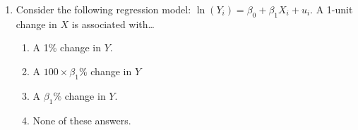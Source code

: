 \documentclass{article}
\begin{document}
\begin{enumerate}
    \item Consider the following regression model: $\ln(Y_i) = \beta_0 + \beta_1 X_i + u_i$. A 1-unit change in $X$ is associated with…
    \begin{enumerate}[label=\alph*)]
        \item A 1\% change in $Y$.
        \item A $100 \times \beta_1 \%$ change in $Y$
        \item A $\beta_1 \%$ change in $Y$. %
        \item None of these answers.
    \end{enumerate}\vspace{.25cm}



\end{enumerate}


\newpage
{}\\[2em]


\end{document}
